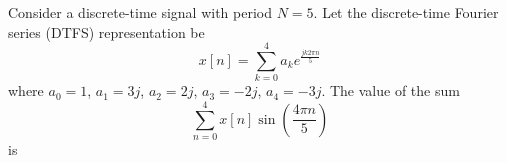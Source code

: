 \documentclass{article}
\begin{document}
Consider a discrete-time signal with period $N=5$. Let the discrete-time Fourier series (DTFS) representation be 
\[ x[n] = \sum\limits_{k=0}^{4} a_k e^{\frac{jk2\pi n}{5}} \]
where $a_0=1$, $a_1=3j$, $a_2=2j$, $a_3=-2j$, $a_4=-3j$. The value of the sum 
\[ \sum\limits_{n=0}^{4}x[n] \sin\left(\frac{4\pi n}{5}\right) \] 
is
\end{document}
